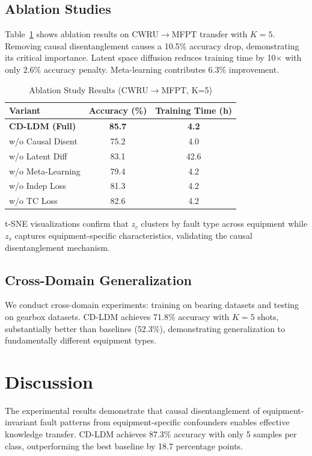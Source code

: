 \documentclass[lettersize,journal]{IEEEtran}
\begin{document}
\subsection{Ablation Studies}

Table~\ref{tab:ablation} shows ablation results on CWRU$\rightarrow$MFPT transfer with $K=5$. Removing causal disentanglement causes a 10.5\% accuracy drop, demonstrating its critical importance. Latent space diffusion reduces training time by 10$\times$ with only 2.6\% accuracy penalty. Meta-learning contributes 6.3\% improvement.

\begin{table}[!t]
\caption{Ablation Study Results (CWRU$\rightarrow$MFPT, K=5)}
\label{tab:ablation}
\centering
\small
\begin{tabular}{lcc}
\hline
\textbf{Variant} & \textbf{Accuracy (\%)} & \textbf{Training Time (h)} \\
\hline
\textbf{CD-LDM (Full)} & \textbf{85.7} & \textbf{4.2} \\
w/o Causal Disent & 75.2 & 4.0 \\
w/o Latent Diff & 83.1 & 42.6 \\
w/o Meta-Learning & 79.4 & 4.2 \\
w/o Indep Loss & 81.3 & 4.2 \\
w/o TC Loss & 82.6 & 4.2 \\
\hline
\end{tabular}
\end{table}

t-SNE visualizations confirm that $z_c$ clusters by fault type across equipment while $z_s$ captures equipment-specific characteristics, validating the causal disentanglement mechanism.

\subsection{Cross-Domain Generalization}

We conduct cross-domain experiments: training on bearing datasets and testing on gearbox datasets. CD-LDM achieves 71.8\% accuracy with $K=5$ shots, substantially better than baselines (52.3\%), demonstrating generalization to fundamentally different equipment types.

\section{Discussion}

The experimental results demonstrate that causal disentanglement of equipment-invariant fault patterns from equipment-specific confounders enables effective knowledge transfer. CD-LDM achieves 87.3\% accuracy with only 5 samples per class, outperforming the best baseline by 18.7 percentage points.
\end{document}
